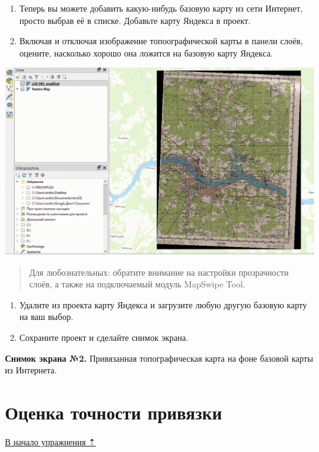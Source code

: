 \documentclass[
  12pt,
]{book}
\begin{document}
\begin{enumerate}
\def\labelenumi{\arabic{enumi}.}
\setcounter{enumi}{4}
\item
  Теперь вы можете добавить какую-нибудь базовую карту из сети Интернет, просто выбрав её в списке. Добавьте карту Яндекса в проект.
\item
  Включая и отключая изображение топоографической карты в панели слоёв, оцените, насколько хорошо она ложится на базовую карту Яндекса.
\end{enumerate}

\includegraphics{images/Ex05_Reference/Overlay.gif}

\begin{quote}
Для любознательных: обратите внимание на настройки прозрачности слоёв, а также на подключаемый модуль MapSwipe Tool.
\end{quote}

\begin{enumerate}
\def\labelenumi{\arabic{enumi}.}
\setcounter{enumi}{6}
\item
  Удалите из проекта карту Яндекса и загрузите любую другую базовую карту на ваш выбор.
\item
  Сохраните проект и сделайте снимок экрана.
\end{enumerate}

\textbf{Снимок экрана №2.} Привязанная топографическая карта на фоне базовой карты из Интернета.

\hypertarget{raster-reference-accuracy}{%
\section{Оценка точности привязки}\label{raster-reference-accuracy}}

\protect\hyperlink{raster-reference}{В начало упражнения ⇡}
\end{document}
